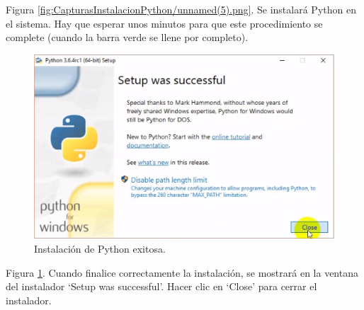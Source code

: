 Figura \ref{fig:CapturasInstalacionPython/unnamed(5).png}. Se instalará Python en el sistema. Hay que esperar unos minutos para que este procedimiento se complete (cuando la barra verde se llene por completo).\\[20pt]

\begin{figure}[h!]
  	\centering
	\includegraphics[width=\textwidth]{CapturasInstalacionPython/unnamed(6).png}
	\caption{Instalación de Python exitosa.
	\label{fig:CapturasInstalacionPython/unnamed(6).png}}
\end{figure}

Figura \ref{fig:CapturasInstalacionPython/unnamed(6).png}. Cuando finalice correctamente la instalación, se mostrará en la ventana del instalador ‘Setup was successful’. Hacer clic en ‘Close’ para cerrar el instalador.\\[20pt]

